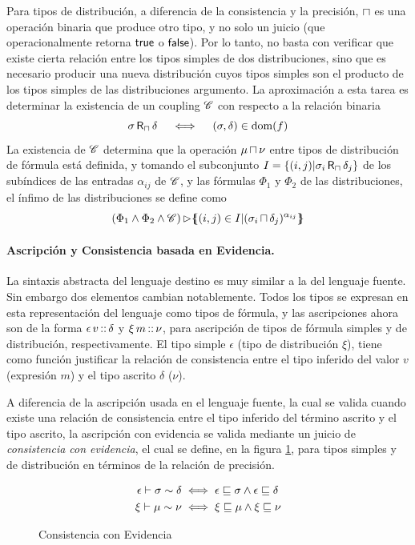 Para tipos de distribución, a diferencia de la consistencia y la precisión, $\mathop{\sqcap}$ es una operación binaria que produce otro tipo, y no solo un juicio (que operacionalmente retorna $\mathord{\text{\sffamily true}}$ o $\mathord{\text{\sffamily false}}$). Por lo tanto, no basta con verificar que existe cierta relación entre los tipos simples de dos distribuciones, sino que es necesario producir una nueva distribución cuyos tipos simples son el producto de los tipos simples de las distribuciones argumento. La aproximación a esta tarea es determinar la existencia de un coupling $\mathscr{C}$ con respecto a la relación binaria
\[ \sigma \mathop{\text{\sffamily R}_{\mathop{\sqcap}}} \delta \quad \iff \quad {(\sigma,\delta)\in \operatorname{dom}(f)}\]
La existencia de $\mathscr{C}$ determina que la operación $\mu \mathop{\sqcap} \nu$ entre tipos de distribución de fórmula está definida, y tomando el subconjunto $ I = \{ (i,j) |  \sigma_i \mathop{\text{\sffamily R}_{\mathop{\sqcap}}} \delta_j \}$ de los subíndices de las entradas $\alpha_{ij}$ de $\mathscr{C}$, y las fórmulas $\Phi_1$ y $\Phi_2$ de las distribuciones, el ínfimo de las distribuciones se define como 
\[ (\Phi_1 \land \Phi_2 \land \mathscr{C}) \mathop{\rhd} \{\mskip-7mu\{ {(i,j) \in I | (\sigma_i \mathop{\sqcap} \delta_j) ^{\alpha_{ij}}} \}\mskip-7mu\}  \]

\paragraph{Ascripción y Consistencia basada en Evidencia.}
\label{sec:lang-trgt-ascr}
La sintaxis abstracta del lenguaje destino es muy similar a la del lenguaje fuente.  Sin embargo dos elementos cambian notablemente. Todos los tipos se expresan en esta representación del lenguaje como tipos de fórmula, y las ascripciones ahora son de la forma $\epsilon\, v \mathop{\text{\sffamily ::}} \delta$ y $\xi\, m \mathop{\text{\sffamily ::}} \nu$, para ascripción de tipos de fórmula simples y de distribución, respectivamente. El tipo simple $\epsilon$ (tipo de distribución $\xi$), tiene como función justificar la relación de consistencia entre el tipo inferido del valor $v$ (expresión $m$) y el tipo ascrito $\delta$ ($\nu$).

A diferencia de la ascripción usada en el lenguaje fuente, la cual se valida cuando existe una relación de consistencia entre el tipo inferido del término ascrito y el tipo ascrito, la ascripción con evidencia se valida mediante un juicio de \emph{consistencia con evidencia}, el cual se define, en la figura \ref{fig:econsistency}, para tipos simples y de distribución en términos de la relación de precisión.
\begin{figure}[htbp]
\centering
\setlength{\belowdisplayskip}{2pt}
\setlength{\abovedisplayskip}{4pt}
\begin{align*}
\epsilon \vdash \sigma \sim \delta &\iff  \epsilon \sqsubseteq \sigma \land \epsilon \sqsubseteq \delta\\
\xi \vdash \mu \sim \nu &\iff  \xi \sqsubseteq \mu \land \xi \sqsubseteq \nu
\end{align*}
\captionsetup{skip=2pt}
\caption{Consistencia con Evidencia}
\label{fig:econsistency}
\end{figure}

